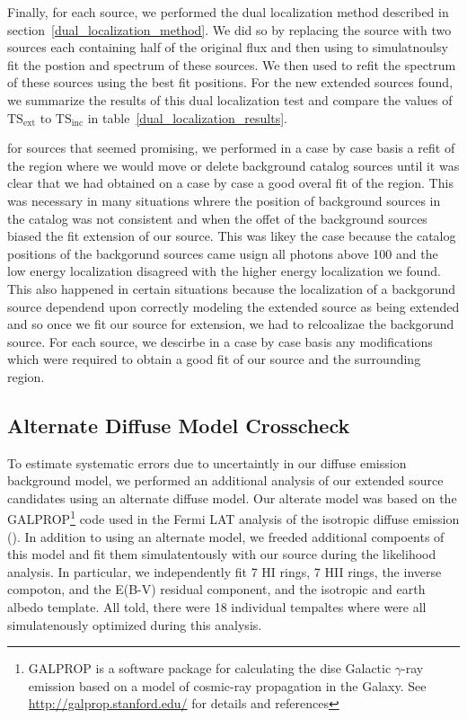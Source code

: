 \documentclass[12pt,preprint]{aastex}
\newcommand{\mev}{\text{MeV}\xspace}
\newcommand{\tsext}{{\ensuremath{\text{TS}_\text{ext}}}\xspace}
\newcommand{\tsinc}{\ensuremath{\text{TS}_\text{inc}}\xspace}
\newcommand{\pointlike}{\text{\em pointlike}\xspace}
\newcommand{\gtlike}{\text{\em gtlike}\xspace}
\begin{document}
Finally, for each source, we performed the dual localization method
described in section~\ref{dual_localization_method}.  We 
did so by replacing the source with two sources each containing
half of the original flux and then using \pointlike to
simulatnoulsy fit the postion and spectrum of these sources.
We then used \gtlike to refit the spectrum of these
sources using the best fit positions. For the
new extended sources found, we summarize the results of
this dual localization test and compare the values of \tsext
to \tsinc in table~\ref{dual_localization_results}.

for sources that seemed promising, we performed in a case
by case basis a refit of the region where we would move or delete
background catalog sources until it was clear that we had obtained on
a case by case a good overal fit of the region. This was necessary in
many situations whrere the position of background sources in the catalog
was not consistent and when the offet of the background sources biased
the fit extension of our source. This was likey the case because the
catalog positions of the backgorund sources came usign all photons above
100 \mev and the low energy localization disagreed with the higher energy
localization we found. This also happened in certain situations because
the localization of a backgorund source dependend upon correctly modeling
the extended source as being extended and so once we fit our source for
extension, we had to relcoalizae the backgorund source.  For each source,
we descirbe in a case by case basis any modifications which were required
to obtain a good fit of our source and the surrounding region.

\subsection{Alternate Diffuse Model Crosscheck}
\label{alt_diff_model_description}

To estimate systematic errors due to uncertaintly in our diffuse
emission background model, we performed an additional analysis
of our extended source candidates using an alternate diffuse
model. Our alterate model was based on the GALPROP\footnote{GALPROP
is a software package for calculating the dise Galactic $\gamma$-ray
emission based on a model of cosmic-ray propagation in the Galaxy. See
\url{http://galprop.stanford.edu/} for details and references} code
used in the Fermi LAT analysis of the isotropic diffuse emission
(\cite{isotropic_lat}).  In addition to using an alternate model, we
freeded additional compoents of this model and fit them simulatentously
with our source during the likelihood analysis. In particular,
we independently fit 7 HI rings, 7 HII rings, the inverse compoton,
and the E(B-V) residual component, and the isotropic and earth albedo
template. All told, there were 18 individual tempaltes where were all
simulatenously optimized during this analysis.
\end{document}
